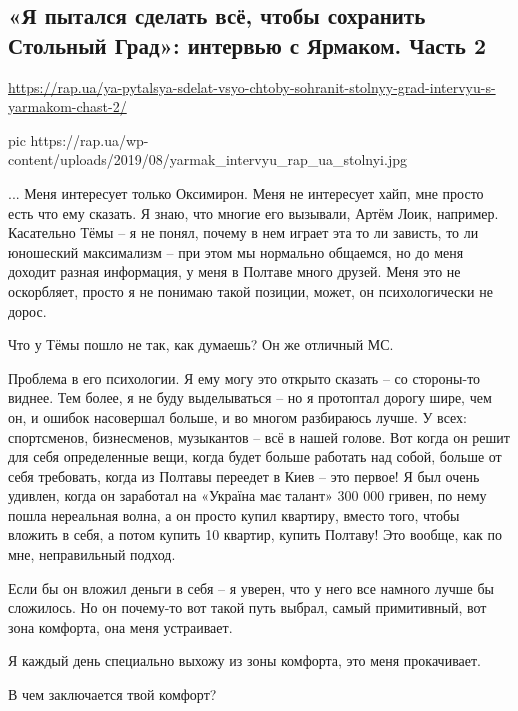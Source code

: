  
 

\subsection{«Я пытался сделать всё, чтобы сохранить Стольный Град»: интервью с Ярмаком. Часть 2}
\url{https://rap.ua/ya-pytalsya-sdelat-vsyo-chtoby-sohranit-stolnyy-grad-intervyu-s-yarmakom-chast-2/}

\ifcmt
pic https://rap.ua/wp-content/uploads/2019/08/yarmak_intervyu_rap_ua_stolnyi.jpg
\fi

... Меня интересует только Оксимирон. Меня не интересует хайп, мне просто есть
что ему сказать. Я знаю, что многие его вызывали, Артём Лоик, например.
Касательно Тёмы – я не понял, почему в нем играет эта то ли зависть, то ли
юношеский максимализм – при этом мы нормально общаемся, но до меня доходит
разная информация, у меня в Полтаве много друзей. Меня это не оскорбляет,
просто я не понимаю такой позиции, может, он психологически не дорос.

Что у Тёмы пошло не так, как думаешь? Он же отличный МС.

Проблема в его психологии. Я ему могу это открыто сказать – со стороны-то
виднее. Тем более, я не буду выделываться – но я протоптал дорогу шире, чем он,
и ошибок насовершал больше, и во многом разбираюсь лучше. У всех: спортсменов,
бизнесменов, музыкантов – всё в нашей голове. Вот когда он решит для себя
определенные вещи, когда будет больше работать над собой, больше от себя
требовать, когда из Полтавы переедет в Киев – это первое! Я был очень удивлен,
когда он заработал на «Україна має талант» 300 000 гривен, по нему пошла
нереальная волна, а он просто купил квартиру, вместо того, чтобы вложить в
себя, а потом купить 10 квартир, купить Полтаву! Это вообще, как по мне,
неправильный подход.

Если бы он вложил деньги в себя – я уверен, что у него все намного лучше бы
сложилось. Но он почему-то вот такой путь выбрал, самый примитивный, вот зона
комфорта, она меня устраивает.

Я каждый день специально выхожу из зоны комфорта, это меня прокачивает.

В чем заключается твой комфорт?

